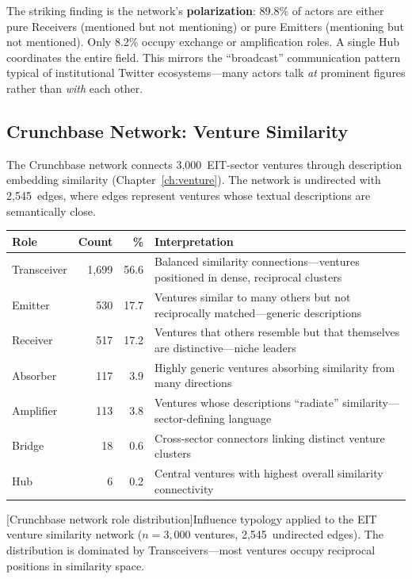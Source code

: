 \documentclass[../main.tex]{subfiles}
\begin{document}
The striking finding is the network's \textbf{polarization}: 89.8\% of actors
are either pure Receivers (mentioned but not mentioning) or pure Emitters
(mentioning but not mentioned). Only 8.2\% occupy exchange or amplification
roles. A single Hub coordinates the entire field. This mirrors the
``broadcast'' communication pattern typical of institutional Twitter
ecosystems---many actors talk \emph{at} prominent figures rather than
\emph{with} each other.

\subsection*{Crunchbase Network: Venture Similarity}

The Crunchbase network connects 3,000~EIT-sector ventures through
description embedding similarity (Chapter~\ref{ch:venture}).
The network is undirected with 2,545~edges, where edges represent ventures
whose textual descriptions are semantically close.

\begin{center}
\scriptsize
\begin{tabular}{@{}lrrp{5cm}@{}}
\toprule
\textbf{Role} & \textbf{Count} & \textbf{\%} & \textbf{Interpretation} \\
\midrule
Transceiver & 1,699 & 56.6 & Balanced similarity connections---ventures
  positioned in dense, reciprocal clusters \\
\addlinespace
Emitter     &   530 & 17.7 & Ventures similar to many others but not
  reciprocally matched---generic descriptions \\
\addlinespace
Receiver    &   517 & 17.2 & Ventures that others resemble but that
  themselves are distinctive---niche leaders \\
\addlinespace
Absorber    &   117 &  3.9 & Highly generic ventures absorbing similarity
  from many directions \\
\addlinespace
Amplifier   &   113 &  3.8 & Ventures whose descriptions ``radiate''
  similarity---sector-defining language \\
\addlinespace
Bridge      &    18 &  0.6 & Cross-sector connectors linking distinct
  venture clusters \\
\addlinespace
Hub         &     6 &  0.2 & Central ventures with highest overall
  similarity connectivity \\
\bottomrule
\end{tabular}
[Crunchbase network role distribution]{Influence typology
applied to the EIT venture similarity network ($n = 3{,}000$ ventures,
2,545~undirected edges). The distribution is dominated by Transceivers---most
ventures occupy reciprocal positions in similarity space.}
\end{center}
\end{document}

